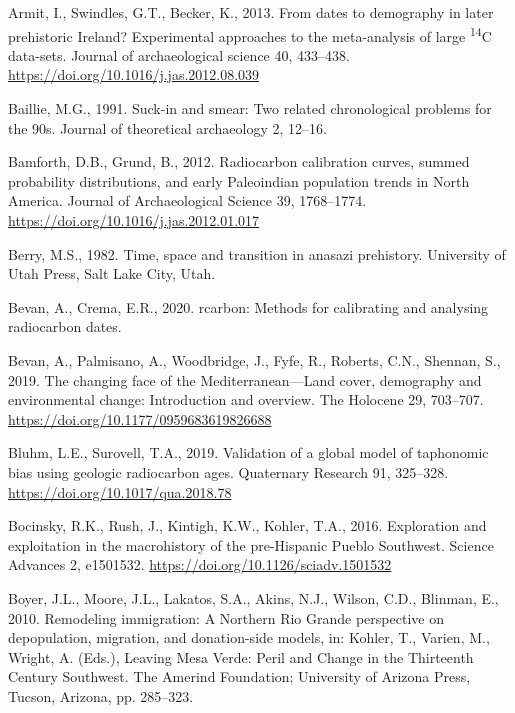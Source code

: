 \documentclass[
]{article}
\newlength{\cslhangindent}
\newenvironment{cslreferences}%
  {\setlength{\parindent}{0pt}%
  \everypar{\setlength{\hangindent}{\cslhangindent}}\ignorespaces}%
  {\par}
\begin{document}
\hypertarget{refs}{}
\begin{cslreferences}
\leavevmode\hypertarget{ref-Armit2013}{}%
Armit, I., Swindles, G.T., Becker, K., 2013. From dates to demography in later prehistoric Ireland? Experimental approaches to the meta-analysis of large \textsuperscript{14}C data-sets. Journal of archaeological science 40, 433--438. \url{https://doi.org/10.1016/j.jas.2012.08.039}

\leavevmode\hypertarget{ref-Baillie1991}{}%
Baillie, M.G., 1991. Suck-in and smear: Two related chronological problems for the 90s. Journal of theoretical archaeology 2, 12--16.

\leavevmode\hypertarget{ref-Bamforth2012}{}%
Bamforth, D.B., Grund, B., 2012. Radiocarbon calibration curves, summed probability distributions, and early Paleoindian population trends in North America. Journal of Archaeological Science 39, 1768--1774. \url{https://doi.org/10.1016/j.jas.2012.01.017}

\leavevmode\hypertarget{ref-Berry1982}{}%
Berry, M.S., 1982. Time, space and transition in anasazi prehistory. University of Utah Press, Salt Lake City, Utah.

\leavevmode\hypertarget{ref-rcarbon}{}%
Bevan, A., Crema, E.R., 2020. rcarbon: Methods for calibrating and analysing radiocarbon dates.

\leavevmode\hypertarget{ref-Bevan2019}{}%
Bevan, A., Palmisano, A., Woodbridge, J., Fyfe, R., Roberts, C.N., Shennan, S., 2019. The changing face of the Mediterranean---Land cover, demography and environmental change: Introduction and overview. The Holocene 29, 703--707. \url{https://doi.org/10.1177/0959683619826688}

\leavevmode\hypertarget{ref-Bluhm2019}{}%
Bluhm, L.E., Surovell, T.A., 2019. Validation of a global model of taphonomic bias using geologic radiocarbon ages. Quaternary Research 91, 325--328. \url{https://doi.org/10.1017/qua.2018.78}

\leavevmode\hypertarget{ref-Bocinsky2016}{}%
Bocinsky, R.K., Rush, J., Kintigh, K.W., Kohler, T.A., 2016. Exploration and exploitation in the macrohistory of the pre-Hispanic Pueblo Southwest. Science Advances 2, e1501532. \url{https://doi.org/10.1126/sciadv.1501532}

\leavevmode\hypertarget{ref-Boyer2010}{}%
Boyer, J.L., Moore, J.L., Lakatos, S.A., Akins, N.J., Wilson, C.D., Blinman, E., 2010. Remodeling immigration: A Northern Rio Grande perspective on depopulation, migration, and donation-side models, in: Kohler, T., Varien, M., Wright, A. (Eds.), Leaving Mesa Verde: Peril and Change in the Thirteenth Century Southwest. The Amerind Foundation; University of Arizona Press, Tucson, Arizona, pp. 285--323.


\end{cslreferences}
\end{document}
